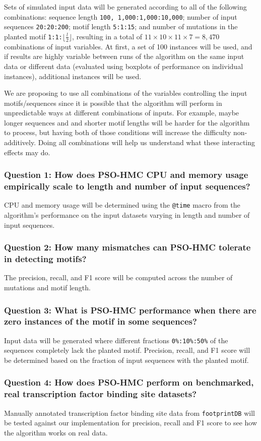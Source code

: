 \documentclass{article}
\begin{document}
  Sets of simulated input data will be generated according to all of the following combinations: sequence length \texttt{100, 1,000:1,000:10,000}; number of input sequences \texttt{20:20:200}; motif length \texttt{5:1:15}; and number of mutations in the planted motif \texttt{1:1:$\lfloor \frac{l}{2} \rfloor$}, resulting in a total of \texttt{$11 \times 10 \times 11 \times 7 = 8,470$} combinations of input variables. At first, a set of 100 instances will be used, and if results are highly variable between runs of the algorithm on the same input data or different data (evaluated using boxplots of performance on individual instances), additional instances will be used.
  
  We are proposing to use all combinations of the variables controlling the input motifs/sequences since it is possible that the algorithm will perform in unpredictable ways at different combinations of inputs. For example, maybe longer sequences and and shorter motif lengths will be harder for the algorithm to process, but having both of those conditions will increase the difficulty non-additively. Doing all combinations will help us understand what these interacting effects may do.
\subsubsection{Question 1: How does PSO-HMC CPU and memory usage empirically scale to length and number of input sequences?}
CPU and memory usage will be determined using the \texttt{@time} macro from the algorithm's performance on the input datasets varying in length and number of input sequences.
\subsubsection{Question 2: How many mismatches can PSO-HMC tolerate in detecting motifs?}
The precision, recall, and F1 score will be computed across the number of mutations and motif length.
\subsubsection{Question 3: What is PSO-HMC performance when there are zero instances of the motif in some sequences?}
Input data will be generated where different fractions \texttt{0\%:10\%:50\%} of the sequences completely lack the planted motif. Precision, recall, and F1 score will be determined based on the fraction of input sequences with the planted motif.
\subsubsection{Question 4: How does PSO-HMC perform on benchmarked, real transcription factor binding site datasets?}
Manually annotated transcription factor binding site data from \texttt{footprintDB} will be tested against our implementation for precision, recall and F1 score to see how the algorithm works on real data.
\end{document}
